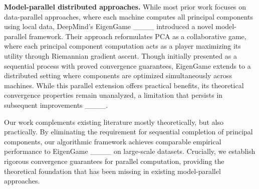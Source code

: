 \textbf{Model-parallel distributed approaches.} While most prior work focuses on data-parallel approaches, where each machine computes all principal components using local data, DeepMind's EigenGame ____ introduced a novel model-parallel framework. Their approach reformulates PCA as a collaborative game, where each principal component computation acts as a player maximizing its utility through Riemannian gradient ascent. Though initially presented as a sequential process with proved convergence guarantees, EigenGame extends to a distributed setting where components are optimized simultaneously across machines. While this parallel extension offers practical benefits, its theoretical convergence properties remain unanalyzed, a limitation that persists in subsequent improvements ____.

Our work complements existing literature mostly theoretically, but also practically. By eliminating the requirement for sequential completion of principal components, our algorithmic framework achieves comparable empirical performance to EigenGame ____ on large-scale datasets. Crucially, we establish rigorous convergence guarantees for parallel computation, providing the theoretical foundation that has been missing in existing model-parallel approaches.

\vspace{-0.1cm}